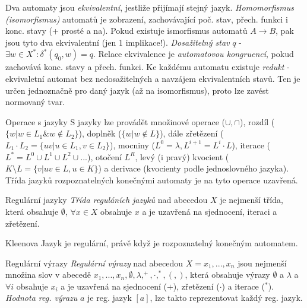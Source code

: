 \begin{definice}
Dva automaty jsou \emph{ekvivalentní}, jestliže přijímají stejný jazyk. \emph{Homomorfismus (isomorfismus)} automatů je zobrazení, zachovávající poč. stav, přech. funkci i konc. stavy (+ prosté a na). Pokud existuje ismorfismus automatů $A\to B$, pak jsou tyto dva ekvivalentní (jen 1 implikace!). \emph{Dosažitelný stav} $q$ - $\exists w \in X^{\ast}: \delta^{\ast}(q_0,w) = q$. Relace ekvivalence je \emph{automatovou kongruencí}, pokud zachovává konc. stavy a přech. funkci. Ke každému automatu existuje \emph{redukt} - ekvivaletní automat bez nedosažitelných a navzájem ekvivalentních stavů. Ten je určen jednoznačně pro daný jazyk (až na isomorfismus), proto lze zavést normovaný tvar.
\end{definice}

\begin{poznamkaN}{Operace s jazyky}
S jazyky lze provádět množinové operace ($\cup, \cap$), rozdíl ($\{ w | w \in L_1 \& w \notin L_2 \}$), doplněk ($\{ w | w \notin L \}$), dále zřetězení ($L_1\cdot L_2 = \{ uv | u \in L_1, v \in L_2 \}$), mocniny ($L^0={\lambda}, L^{i+1} = L^{i}\cdot L$), iterace ($L^{\ast}=L^0 \cup L^1 \cup L^2 \cup ...$), otočení $L^R$, levý (i pravý) kvocient ($K\setminus L = \{ v | uv \in L, u \in K \}$) a derivace (kvocienty podle jednoslovného jazyka). Třída jazyků rozpoznatelných konečnými automaty je na tyto operace uzavřená.
\end{poznamkaN}

\begin{definiceN}{Regulární jazyky}
\emph{Třída reguláních jazyků} nad abecedou $X$ je nejmenší třída, která obsahuje $\emptyset$, $\forall x \in X$ obsahuje ${x}$ a je uzavřená na sjednocení, iteraci a zřetězení.
\end{definiceN}

\begin{vetaN}{Kleenova}
Jazyk je regulární, právě když je rozpoznatelný konečným automatem.
\end{vetaN}

\begin{definiceN}{Regulární výrazy}
\emph{Regulární výrazy} nad abecedou $X={x_1,...,x_n}$ jsou nejmenší množina slov v abecedě ${x_1,...,x_n,\emptyset,\lambda,^{+},\cdot,^{\ast},(,)}$, která obsahuje výrazy $\emptyset$ a $\lambda$ a $\forall i$ obsahuje $x_i$ a je uzavřená na sjednocení ($+$), zřetězení ($\cdot$) a iterace ($^{\ast}$). \emph{Hodnota reg. výrazu} $a$ je reg. jazyk $[a]$, lze takto reprezentovat každý reg. jazyk.
\end{definiceN}

